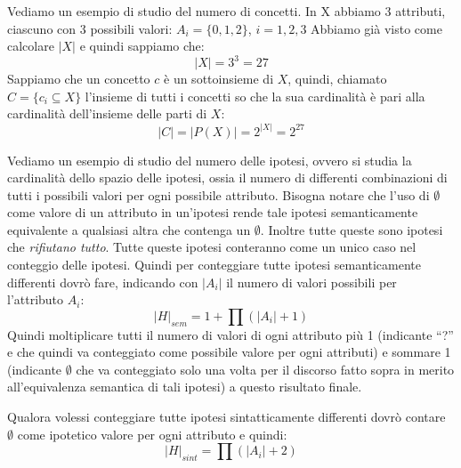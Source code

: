Vediamo un esempio di studio del numero di concetti. In X abbiamo 3 attributi, ciascuno con 3 possibili valori: $A_i = \{0, 1, 2\}$, $i = 1, 2, 3$ Abbiamo già visto come calcolare $|X|$ e quindi sappiamo che: $$|X| = 3^3 = 27$$ Sappiamo che un concetto $c$ è un sottoinsieme di $X$, quindi, chiamato $C = \{c_i \subseteq X\}$ l'insieme di tutti i concetti so che la sua cardinalità è pari
alla cardinalità dell'insieme delle parti di $X$: $$|C| = |P(X)| = 2^{|X|} = 2^{27}$$

Vediamo un esempio di studio del numero delle ipotesi, ovvero si studia la cardinalità dello spazio delle ipotesi, ossia il numero di differenti combinazioni di tutti i possibili valori per ogni possibile attributo. Bisogna notare che l'uso di $\emptyset$ come valore di un attributo in un'ipotesi rende tale ipotesi semanticamente equivalente a qualsiasi altra che contenga un $\emptyset$. Inoltre tutte queste sono ipotesi che \textit{rifiutano tutto}. Tutte queste ipotesi conteranno come un unico caso nel conteggio delle ipotesi. Quindi per conteggiare tutte ipotesi semanticamente differenti dovrò fare, indicando con $|A_i|$ il numero di valori possibili per l'attributo $A_i$:
\begin{equation}
    |H|_{sem} = 1 + \prod (|A_i| + 1)
\end{equation}
Quindi moltiplicare tutti il numero di valori di ogni attributo più 1 (indicante “?” e che quindi va conteggiato come possibile valore per ogni attributi) e sommare 1 (indicante $\emptyset$ che va conteggiato solo una volta per il discorso fatto sopra in merito all'equivalenza semantica di tali ipotesi) a questo risultato finale.

Qualora volessi conteggiare tutte ipotesi sintatticamente differenti dovrò contare $\emptyset$ come ipotetico valore per ogni attributo e quindi:
\begin{equation}
    |H|_{sint} = \prod (|A_i| + 2)
\end{equation}
